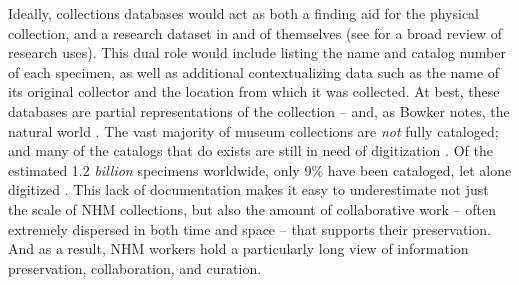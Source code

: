 Ideally, collections databases would act as both a finding aid for the physical collection, and a research dataset in and of themselves (see \cite{Chapman2005} for a broad review of research uses). This dual role would include listing the name and catalog number of each specimen, as well as additional contextualizing data such as the name of its original collector and the location from which it was collected. At best, these databases are partial representations of the collection -- and, as Bowker notes, the natural world \cite{Bowker_2000}. The vast majority of museum collections are \textit{not} fully cataloged; and many of the catalogs that do exists are still in need of digitization \cite{Beaman_2012}. Of the estimated 1.2 \textit{billion} specimens worldwide, only 9\% have been cataloged, let alone digitized \cite{Ari_o_2010}. This lack of documentation makes it easy to underestimate not just the scale of NHM collections, but also the amount of collaborative work -- often extremely dispersed in both time and space -- that supports their preservation. And as a result, NHM workers hold a particularly long view of information preservation, collaboration, and curation.